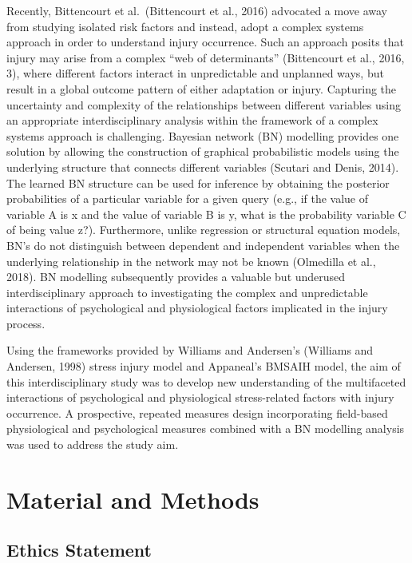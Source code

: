 \documentclass[
  english,
  man,floatsintext]{apa6}
\begin{document}
Recently, Bittencourt et al.~(Bittencourt et al., 2016) advocated a move away from studying isolated risk factors and instead, adopt a complex systems approach in order to understand injury occurrence. Such an approach posits that injury may arise from a complex ``web of determinants'' (Bittencourt et al., 2016, 3), where different factors interact in unpredictable and unplanned ways, but result in a global outcome pattern of either adaptation or injury. Capturing the uncertainty and complexity of the relationships between different variables using an appropriate interdisciplinary analysis within the framework of a complex systems approach is challenging. Bayesian network (BN) modelling provides one solution by allowing the construction of graphical probabilistic models using the underlying structure that connects different variables (Scutari and Denis, 2014). The learned BN structure can be used for inference by obtaining the posterior probabilities of a particular variable for a given query (e.g., if the value of variable A is x and the value of variable B is y, what is the probability variable C of being value z?). Furthermore, unlike regression or structural equation models, BN's do not distinguish between dependent and independent variables when the underlying relationship in the network may not be known (Olmedilla et al., 2018). BN modelling subsequently provides a valuable but underused interdisciplinary approach to investigating the complex and unpredictable interactions of psychological and physiological factors implicated in the injury process.

Using the frameworks provided by Williams and Andersen's (Williams and Andersen, 1998) stress injury model and Appaneal's BMSAIH model, the aim of this interdisciplinary study was to develop new understanding of the multifaceted interactions of psychological and physiological stress-related factors with injury occurrence. A prospective, repeated measures design incorporating field-based physiological and psychological measures combined with a BN modelling analysis was used to address the study aim.

\hypertarget{material-and-methods}{%
\section{Material and Methods}\label{material-and-methods}}

\hypertarget{ethics-statement}{%
\subsection{Ethics Statement}\label{ethics-statement}}
\end{document}
